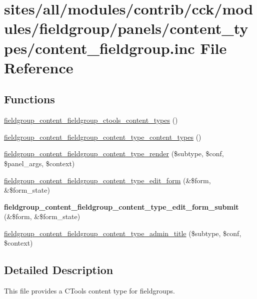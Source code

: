 \hypertarget{content__fieldgroup_8inc}{
\section{sites/all/modules/contrib/cck/modules/fieldgroup/panels/content\_\-types/content\_\-fieldgroup.inc File Reference}
\label{content__fieldgroup_8inc}
}
\subsection*{Functions}
\begin{CompactItemize}
\item 
\hyperlink{content__fieldgroup_8inc_4f3c6e1862b978cab553ab513e5eaa8d}{fieldgroup\_\-content\_\-fieldgroup\_\-ctools\_\-content\_\-types} ()
\item 
\hyperlink{content__fieldgroup_8inc_54d3778b243c30a9834a607438065a58}{fieldgroup\_\-content\_\-fieldgroup\_\-content\_\-type\_\-content\_\-types} ()
\item 
\hyperlink{content__fieldgroup_8inc_7a0c12c225529cc58d8fc7cae3bdf20c}{fieldgroup\_\-content\_\-fieldgroup\_\-content\_\-type\_\-render} (\$subtype, \$conf, \$panel\_\-args, \$context)
\item 
\hyperlink{content__fieldgroup_8inc_92c44e85ae5fca2cdec55f6bc07f4cff}{fieldgroup\_\-content\_\-fieldgroup\_\-content\_\-type\_\-edit\_\-form} (\&\$form, \&\$form\_\-state)
\item 
\hypertarget{content__fieldgroup_8inc_95f0cc91cc7118eb00ab18bfd3758558}{
\textbf{fieldgroup\_\-content\_\-fieldgroup\_\-content\_\-type\_\-edit\_\-form\_\-submit} (\&\$form, \&\$form\_\-state)}
\label{content__fieldgroup_8inc_95f0cc91cc7118eb00ab18bfd3758558}

\item 
\hyperlink{content__fieldgroup_8inc_98c7f48d8f60e2fbd01e64096d169ac0}{fieldgroup\_\-content\_\-fieldgroup\_\-content\_\-type\_\-admin\_\-title} (\$subtype, \$conf, \$context)
\end{CompactItemize}


\subsection{Detailed Description}
This file provides a CTools content type for fieldgroups. 

